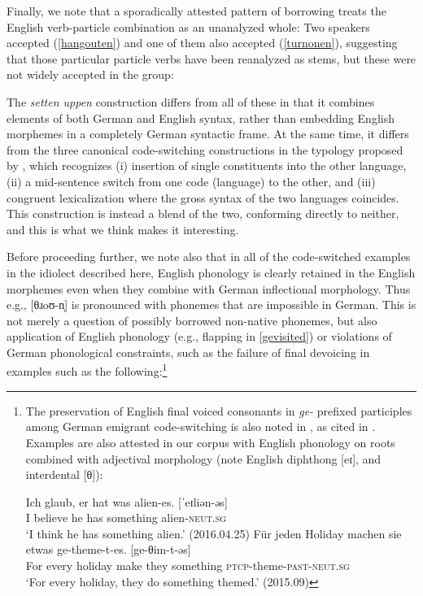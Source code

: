 \documentclass[output=paper]{langscibook}
\begin{document}
Finally, we note that a sporadically attested pattern of borrowing treats the English verb-particle combination as an unanalyzed whole: Two speakers accepted (\ref{hangouten}) and one of them also accepted (\ref{turnonen}), suggesting that those particular particle verbs have been reanalyzed as stems, but these were not widely accepted in the group:

\ea\judgewidth{\%}
\z\z 

The \textit{setten uppen} construction differs from all of these in that it combines elements of both German and English syntax, rather than embedding English morphemes in a completely German syntactic frame. At the same time, it differs from the three canonical code-switching constructions in the typology proposed by \citet{muysken00}, which recognizes (i) insertion of single constituents into the other language, (ii) a mid-sentence switch from one code (language) to the other, and (iii) congruent lexicalization where the gross syntax of the two languages coincides. This construction is instead a blend of the two, conforming directly to neither, and this is what we think makes it interesting.

Before proceeding further, we note also that in all of the code-switched examples in the idiolect described here, English phonology is clearly retained in the English morphemes even when they combine with German inflectional morphology. Thus e.g., {[}θɹoʊ\nobreakdash-n̩{]} is pronounced with phonemes that are impossible in German. This is not merely a question of possibly borrowed non-native phonemes, but also application of English phonology (e.g., flapping in \ref{gevisited}) or violations of German phonological constraints, such as the failure of final devoicing in examples such as the following:\footnote{The preservation of English final voiced consonants in \textit{ge-} prefixed participles among German emigrant code-switching is also noted in \citet{gross00}, as cited in \citet[159--160]{myersscotton02}. Examples are also attested in our corpus with English phonology on roots combined with adjectival morphology (note English diphthong {[}eɪ{]}, and interdental {[}θ{]}):

\ea\gll Ich glaub, er hat was {alien-es. {[}ˈeɪliən-əs{]}}\\
I believe he has something alien-\textsc{neut.sg}\\
\glt `I think he has something alien.' (2016.04.25)
\ex\gll Für jeden Holiday machen sie etwas {ge-theme-t-es. {[}ge-θim-t-əs{]}}\\
For every holiday make they something \textsc{ptcp}-theme-\textsc{past}-\textsc{neut.sg}\\
\glt `For every holiday, they do something themed.' (2015.09)
\z
}
\end{document}
